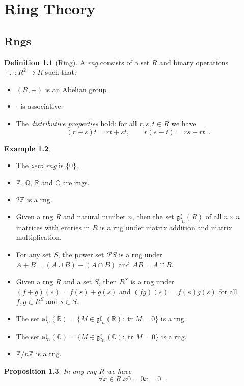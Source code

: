 \documentclass{book}
\newtheorem{prop}{Proposition}[chapter]
\theoremstyle{definition}
\newtheorem{df}[prop]{Definition}
\newtheorem{ex}[prop]{Example}
\newcommand{\gl}[2]{\ensuremath{\mathfrak{gl}_{#1} \left( {#2} \right)}}
\renewcommand{\sl}[2]{\ensuremath{\mathfrak{sl}_{#1} \left( {#2} \right)}}
\newcommand{\tr}{\ensuremath{\operatorname{tr}}}
\begin{document}
\part{Ring Theory}

\chapter{Rngs}

\begin{df}[Ring]
A \emph{rng} consists of a set $R$ and binary operations $+, \cdot : R^2 \rightarrow R$ such that:
\begin{itemize}
\item $(R,+)$ is an Abelian group
\item $\cdot$ is associative.
\item The \emph{distributive properties} hold: for all $r,s,t \in R$ we have
\[ (r+s)t = rt + st, \qquad r(s+t) = rs + rt \enspace .\]
\end{itemize}
\end{df}

\begin{ex}
\begin{itemize}
\item The \emph{zero rng} is $\{0\}$.
\item $\mathbb{Z}$, $\mathbb{Q}$, $\mathbb{R}$ and $\mathbb{C}$ are rngs.
\item
$2 \mathbb{Z}$ is a rng.
\item
Given a rng $R$ and natural number $n$, then the set $\gl{n}{R}$ of all $n \times n$ matrices with entries in $R$ is a rng under matrix addition and matrix multiplication.
\item
For any set $S$, the power set $\mathcal{P} S$ is a rng under $A + B = (A \cup B) - (A \cap B)$ and $AB = A \cap B$.
\item
Given a rng $R$ and a set $S$, then $R^S$ is a rng under $(f + g)(s) = f(s) + g(s)$ and $(fg)(s) = f(s)g(s)$ for all $f,g \in R^S$ and $s \in S$.
\item The set $\sl{n}{\mathbb{R}} = \{ M \in \gl{n}{\mathbb{R}} : \tr M = 0 \}$ is a rng.
\item The set $\sl{n}{\mathbb{C}} = \{ M \in \gl{n}{\mathbb{C}} : \tr M = 0 \}$ is a rng.
\item $\mathbb{Z} / n \mathbb{Z}$ is a rng.
\end{itemize}
\end{ex}

\begin{prop}
In any rng $R$ we have
\[ \forall x \in R. x0 = 0x = 0 \enspace . \]
\end{prop}
\end{document}
